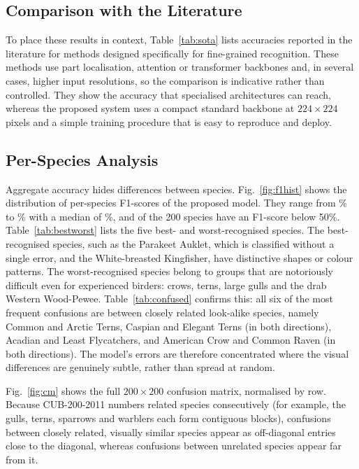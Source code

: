 \documentclass[conference]{IEEEtran}
\begin{document}
\subsection{Comparison with the Literature}
To place these results in context, Table~\ref{tab:sota} lists accuracies reported
in the literature for methods designed specifically for fine-grained recognition.
These methods use part localisation, attention or transformer backbones and, in
several cases, higher input resolutions, so the comparison is indicative rather
than controlled. They show the accuracy that specialised architectures can reach,
whereas the proposed system uses a compact standard backbone at $224\times224$
pixels and a simple training procedure that is easy to reproduce and deploy.

\subsection{Per-Species Analysis}
Aggregate accuracy hides differences between species. Fig.~\ref{fig:f1hist} shows
the distribution of per-species F1-scores of the proposed model. They range from
\MinClassF\% to \MaxClassF\% with a median of \MedianClassF\%, and
\NClassesBelowHalf{} of the 200 species have an F1-score below 50\%.
Table~\ref{tab:bestworst} lists the five best- and worst-recognised species. The
best-recognised species, such as the Parakeet Auklet, which is classified without
a single error, and the White-breasted Kingfisher, have distinctive shapes or
colour patterns. The worst-recognised species belong to groups that are notoriously
difficult even for experienced birders: crows, terns, large gulls and the drab
Western Wood-Pewee. Table~\ref{tab:confused} confirms this: all six of the most
frequent confusions are between closely related look-alike species, namely Common
and Arctic Terns, Caspian and Elegant Terns (in both directions), Acadian and
Least Flycatchers, and American Crow and Common Raven (in both directions). The
model's errors are therefore concentrated where the visual differences are
genuinely subtle, rather than spread at random.

Fig.~\ref{fig:cm} shows the full $200\times200$ confusion matrix, normalised by
row. Because CUB-200-2011 numbers related species consecutively (for example,
the gulls, terns, sparrows and warblers each form contiguous blocks), confusions
between closely related, visually similar species appear as off-diagonal entries
close to the diagonal, whereas confusions between unrelated species appear far
from it.
\end{document}
